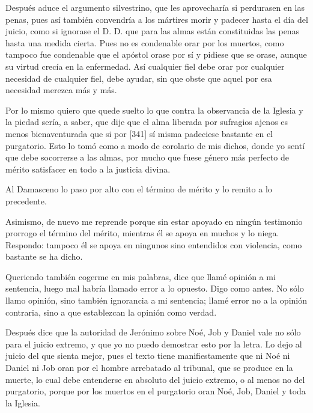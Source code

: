 Después aduce el argumento silvestrino, que les aprovecharía si perdurasen en las penas, pues así también convendría a los mártires morir y padecer hasta el día del juicio, como si ignorase el D. D. que para las almas están constituidas las penas hasta una medida cierta. Pues no es condenable orar por los muertos, como tampoco fue condenable que el apóstol orase por sí y pidiese que se orase, aunque su virtud crecía en la enfermedad. Así cualquier fiel debe orar por cualquier necesidad de cualquier fiel, debe ayudar, sin que obste que aquel por esa necesidad merezca más y más.

Por lo mismo quiero que quede suelto lo que contra la observancia de la Iglesia y la piedad sería, a saber, que dije que el alma liberada por sufragios ajenos es menos bienaventurada que si por [341] sí misma padeciese bastante en el purgatorio. Esto lo tomó como a modo de corolario de mis dichos, donde yo sentí que debe socorrerse a las almas, por mucho que fuese género más perfecto de mérito satisfacer en todo a la justicia divina.

Al Damasceno lo paso por alto con el término de mérito y lo remito a lo precedente.

Asimismo, de nuevo me reprende porque sin estar apoyado en ningún testimonio prorrogo el término del mérito, mientras él se apoya en muchos y lo niega. Respondo: tampoco él se apoya en ningunos sino entendidos con violencia, como bastante se ha dicho.

Queriendo también cogerme en mis palabras, dice que llamé opinión a mi sentencia, luego mal habría llamado error a lo opuesto. Digo como antes. No sólo llamo opinión, sino también ignorancia a mi sentencia; llamé error no a la opinión contraria, sino a que establezcan la opinión como verdad.

Después dice que la autoridad de Jerónimo sobre Noé, Job y Daniel vale no sólo para el juicio extremo, y que yo no puedo demostrar esto por la letra. Lo dejo al juicio del que sienta mejor, pues el texto tiene manifiestamente que ni Noé ni Daniel ni Job oran por el hombre arrebatado al tribunal, que se produce en la muerte, lo cual debe entenderse en absoluto del juicio extremo, o al menos no del purgatorio, porque por los muertos en el purgatorio oran Noé, Job, Daniel y toda la Iglesia.

